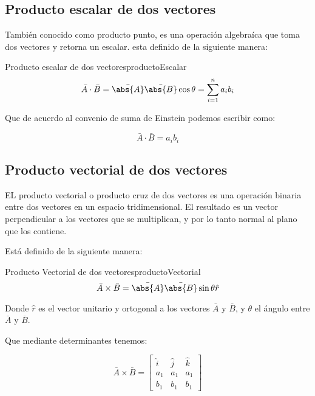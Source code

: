 \subsection*{Producto escalar de dos vectores}

También conocido como producto punto, es una operación algebraíca que toma dos
vectores y retorna un escalar. esta definido de la siguiente manera:

\begin{theorem}{Producto escalar de dos vectores}{productoEscalar}
    \begin{equation}
        \bar{A} \cdot \bar{B}= \bar{\abs{A}} \bar{\abs{B}} \cos \theta
        = \sum_{i=1}^{n} a_i b_i
    \end{equation}
\end{theorem}

Que de acuerdo al convenio de suma de Einstein podemos escribir como:

\begin{equation}
    \bar{A} \cdot \bar{B} = a_i b_i
\end{equation}

\subsection*{Producto vectorial de dos vectores}

EL producto vectorial o producto cruz de dos vectores es una operación binaria
entre dos vectores en un espacio tridimensional. El resultado es un vector
perpendicular a los vectores que se multiplican, y por lo tanto normal al plano
que los contiene.

Está definido de la siguiente manera:

\begin{theorem}{Producto Vectorial de dos vectores}{productoVectorial}
\begin{equation}
    \bar{A} \times \bar{B}= \bar{\abs{A}} \bar{\abs{B}} \sin \theta \hat{r}
\end{equation}
\end{theorem}

Donde $\hat{r}$ es el vector unitario y ortogonal a los vectores $\bar{A}$ y
$\bar{B}$, y $\theta$ el ángulo entre $\bar{A}$ y $\bar{B}$.

Que mediante determinantes tenemos:

\begin{equation}
    \bar{A} \times \bar{B}=
    \begin{bmatrix}
        \hat{i} & \hat{j} & \hat{k}\\ 
         a_1 & a_1 & a_1\\ 
         b_1 & b_1 & b_1
    \end{bmatrix}
\end{equation}

